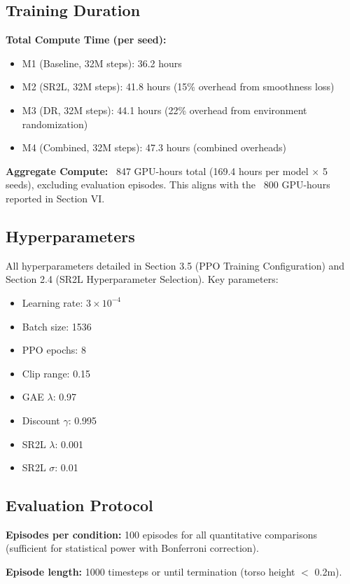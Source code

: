 \documentclass[conference]{IEEEtran}
\begin{document}
\subsection{Training Duration}

\textbf{Total Compute Time (per seed):}
\begin{itemize}
    \item M1 (Baseline, 32M steps): 36.2 hours
    \item M2 (SR2L, 32M steps): 41.8 hours (15\% overhead from smoothness loss)
    \item M3 (DR, 32M steps): 44.1 hours (22\% overhead from environment randomization)
    \item M4 (Combined, 32M steps): 47.3 hours (combined overheads)
\end{itemize}

\textbf{Aggregate Compute:} ~847 GPU-hours total (169.4 hours per model × 5 seeds), excluding evaluation episodes. This aligns with the ~800 GPU-hours reported in Section VI.

\subsection{Hyperparameters}

All hyperparameters detailed in Section 3.5 (PPO Training Configuration) and Section 2.4 (SR2L Hyperparameter Selection). Key parameters:
\begin{itemize}
    \item Learning rate: $3 \times 10^{-4}$
    \item Batch size: 1536
    \item PPO epochs: 8
    \item Clip range: 0.15
    \item GAE $\lambda$: 0.97
    \item Discount $\gamma$: 0.995
    \item SR2L $\lambda$: 0.001
    \item SR2L $\sigma$: 0.01
\end{itemize}

\subsection{Evaluation Protocol}

\textbf{Episodes per condition:} 100 episodes for all quantitative comparisons (sufficient for statistical power with Bonferroni correction).

\textbf{Episode length:} 1000 timesteps or until termination (torso height $<$ 0.2m).
\end{document}
